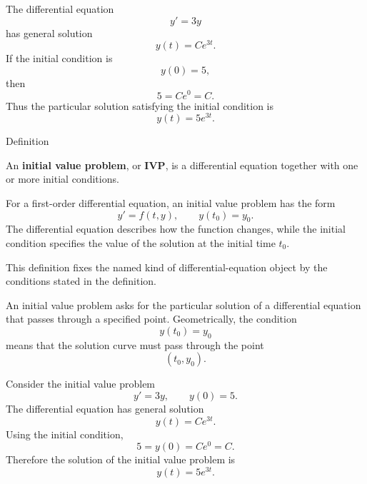 \begin{example*}
The differential equation
\[
y'=3y
\]
has general solution
\[
y(t)=Ce^{3t}.
\]
If the initial condition is
\[
y(0)=5,
\]
then
\[
5=Ce^{0}=C.
\]
Thus the particular solution satisfying the initial condition is
\[
y(t)=5e^{3t}.
\]
\end{example*}



\begin{definitionbox}{Definition}
\begin{definition}
\label{def:ordinary-differential-equations-solutions-initial-value-problem}
An \textbf{initial value problem}, or \textbf{IVP}, is a differential equation together with one or more initial conditions.

For a first-order differential equation, an initial value problem has the form
\[
y'=f(t,y),
\qquad
y(t_0)=y_0.
\]
The differential equation describes how the function changes, while the initial condition specifies the value of the solution at the initial time $t_0$.
\end{definition}
\end{definitionbox}

\begin{remark*}
This definition fixes the named kind of differential-equation object by the
conditions stated in the definition.
\end{remark*}

\NoLocalDependencies

\begin{remark*}[Interpretation]
An initial value problem asks for the particular solution of a differential equation that passes through a specified point. Geometrically, the condition
\[
y(t_0)=y_0
\]
means that the solution curve must pass through the point
\[
(t_0,y_0).
\]
\end{remark*}

\begin{example*}
Consider the initial value problem
\[
y'=3y,
\qquad
y(0)=5.
\]
The differential equation has general solution
\[
y(t)=Ce^{3t}.
\]
Using the initial condition,
\[
5=y(0)=Ce^0=C.
\]
Therefore the solution of the initial value problem is
\[
y(t)=5e^{3t}.
\]
\end{example*}



